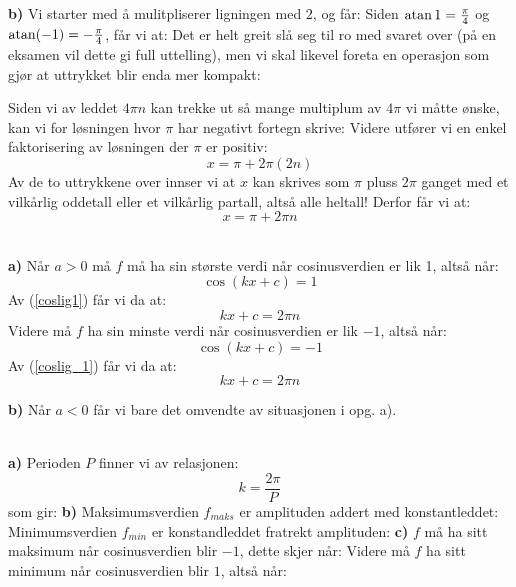 \textbf{b)} Vi starter med å mulitpliserer ligningen med $ 2 $, og får:
Siden $ \operatorname{atan} 1 = \frac{\pi}{4} $ og $ \operatorname{atan} (-1) = -\frac{\pi}{4} $, får vi at:
Det er helt greit slå seg til ro med svaret over (på en eksamen vil dette gi full uttelling), men vi skal likevel foreta en operasjon som gjør at uttrykket blir enda mer kompakt:\vsk

Siden vi av leddet $ 4\pi n $ kan trekke ut så mange multiplum av $ 4\pi $ vi måtte ønske, kan vi for løsningen hvor $ \pi $ har negativt fortegn skrive:
Videre utfører vi en enkel faktorisering av løsningen der $ \pi $ er positiv:
\[ x=\pi+ 2\pi(2n) \]
Av de to uttrykkene over innser vi at $ x $ kan skrives som $ \pi $ pluss $ 2\pi $ ganget med et vilkårlig oddetall eller et vilkårlig partall, altså alle heltall! Derfor får vi at:
\[ x = \pi +2\pi n \]

\\
\textbf{a)} Når $ a>0 $ må $ f $ må ha sin største verdi når cosinusverdien er lik 1, altså når:
\[ \cos(kx + c) = 1 \]
Av (\ref{coslig1}) får vi da at:
\[ kx +c = 2\pi n \]
Videre må $ f $ ha sin minste verdi når cosinusverdien er lik $ -1 $, altså når:
\[ \cos(kx + c) = -1 \]
Av (\ref{coslig_1}) får vi da at:
\[ kx +c = 2\pi n \]

\textbf{b)} Når $ a<0 $ får vi bare det omvendte av situasjonen i opg. a).\vsk

\\
\textbf{a)}
Perioden $ P $ finner vi av relasjonen:
\[ k = \frac{2\pi}{P}  \]
som gir:
\textbf{b)} Maksimumsverdien $ f_{maks} $ er amplituden addert med konstantleddet:
Minimumsverdien $ f_{min} $ er konstandleddet fratrekt amplituden:
\textbf{c)} $ f $ må ha sitt maksimum når cosinusverdien blir $ -1 $, dette skjer når:
Videre må $ f $ ha sitt minimum når cosinusverdien blir $ 1 $, altså når:

